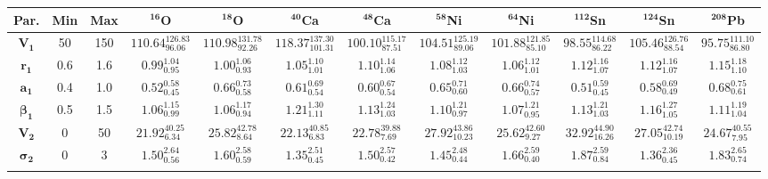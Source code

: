 \bgroup
\def\arraystretch{1.5}%
\begin{tabular}{ c c c c c c c c c c c c} 
\textbf{Par.} & \textbf{Min} & \textbf{Max} & \textbf{$\mathbf{^{16}}$O}& \textbf{$\mathbf{^{18}}$O}& \textbf{$\mathbf{^{40}}$Ca}& \textbf{$\mathbf{^{48}}$Ca}& \textbf{$\mathbf{^{58}}$Ni}& \textbf{$\mathbf{^{64}}$Ni}& \textbf{$\mathbf{^{112}}$Sn}& \textbf{$\mathbf{^{124}}$Sn}& \textbf{$\mathbf{^{208}}$Pb}\\
 \hline 
$\mathbf{V_{1}}$ & 50 & 150 & $110.64^{126.83}_{96.06}$ & $110.98^{131.78}_{92.26}$ & $118.37^{137.30}_{101.31}$ & $100.10^{115.17}_{87.51}$ & $104.51^{125.19}_{89.06}$ & $101.88^{121.85}_{85.10}$ & $98.55^{114.68}_{86.22}$ & $105.46^{126.76}_{88.54}$ & $95.75^{111.10}_{86.80}$\\ 
$\mathbf{r_{1}}$ & 0.6 & 1.6 & $0.99^{1.04}_{0.95}$ & $1.00^{1.06}_{0.93}$ & $1.05^{1.10}_{1.01}$ & $1.10^{1.14}_{1.06}$ & $1.08^{1.12}_{1.03}$ & $1.06^{1.12}_{1.01}$ & $1.12^{1.16}_{1.07}$ & $1.12^{1.16}_{1.07}$ & $1.15^{1.18}_{1.10}$\\ 
$\mathbf{a_{1}}$ & 0.4 & 1.0 & $0.52^{0.58}_{0.45}$ & $0.66^{0.73}_{0.58}$ & $0.61^{0.69}_{0.54}$ & $0.60^{0.67}_{0.54}$ & $0.65^{0.71}_{0.60}$ & $0.66^{0.74}_{0.57}$ & $0.51^{0.59}_{0.45}$ & $0.58^{0.69}_{0.49}$ & $0.68^{0.75}_{0.61}$\\ 
$\mathbf{\beta_{1}}$ & 0.5 & 1.5 & $1.06^{1.15}_{0.99}$ & $1.06^{1.17}_{0.94}$ & $1.21^{1.30}_{1.11}$ & $1.13^{1.24}_{1.03}$ & $1.10^{1.21}_{0.97}$ & $1.07^{1.21}_{0.95}$ & $1.13^{1.21}_{1.03}$ & $1.16^{1.27}_{1.05}$ & $1.11^{1.19}_{1.04}$\\ 
$\mathbf{V_{2}}$ & 0 & 50 & $21.92^{40.25}_{6.34}$ & $25.82^{42.78}_{8.64}$ & $22.13^{40.85}_{6.83}$ & $22.78^{39.88}_{7.69}$ & $27.92^{43.86}_{10.23}$ & $25.62^{42.60}_{9.27}$ & $32.92^{44.90}_{16.26}$ & $27.05^{42.74}_{10.19}$ & $24.67^{40.55}_{7.95}$\\ 
$\mathbf{\sigma_{2}}$ & 0 & 3 & $1.50^{2.64}_{0.56}$ & $1.60^{2.58}_{0.59}$ & $1.35^{2.51}_{0.45}$ & $1.50^{2.57}_{0.42}$ & $1.45^{2.48}_{0.44}$ & $1.66^{2.59}_{0.40}$ & $1.87^{2.59}_{0.84}$ & $1.36^{2.36}_{0.45}$ & $1.83^{2.65}_{0.74}$\\ 
\\ 
\end{tabular}
\egroup